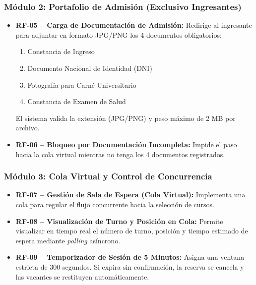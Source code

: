 \documentclass[12pt,a4paper]{article}
\begin{document}
\subsubsection{M\'odulo 2: Portafolio de Admisi\'on (Exclusivo Ingresantes)}

\begin{itemize}[leftmargin=*]
  \item \textbf{RF-05 -- Carga de Documentaci\'on de Admisi\'on:}
    Redirige al ingresante para adjuntar en formato JPG/PNG los 4 documentos obligatorios:
    \begin{enumerate}
      \item Constancia de Ingreso
      \item Documento Nacional de Identidad (DNI)
      \item Fotograf\'ia para Carn\'e Universitario
      \item Constancia de Examen de Salud
    \end{enumerate}
    El sistema valida la extensi\'on (JPG/PNG) y peso m\'aximo de 2 MB por archivo.

  \item \textbf{RF-06 -- Bloqueo por Documentaci\'on Incompleta:}
    Impide el paso hacia la cola virtual mientras no tenga los 4 documentos registrados.
\end{itemize}

\subsubsection{M\'odulo 3: Cola Virtual y Control de Concurrencia}

\begin{itemize}[leftmargin=*]
  \item \textbf{RF-07 -- Gesti\'on de Sala de Espera (Cola Virtual):}
    Implementa una cola para regular el flujo concurrente hacia la selecci\'on de cursos.

  \item \textbf{RF-08 -- Visualizaci\'on de Turno y Posici\'on en Cola:}
    Permite visualizar en tiempo real el n\'umero de turno, posici\'on y tiempo estimado de espera mediante \textit{polling} as\'incrono.

  \item \textbf{RF-09 -- Temporizador de Sesi\'on de 5 Minutos:}
    Asigna una ventana estricta de 300 segundos. Si expira sin confirmaci\'on, la reserva se cancela y las vacantes se restituyen autom\'aticamente.
\end{itemize}
\end{document}
